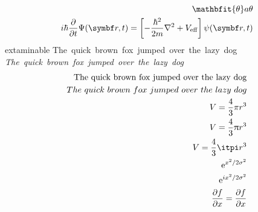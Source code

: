 \begin{align}
\ \mathbfit{\theta} a \theta \\
i\hbar\pdv t \Psi(\vec r, t) = \left[-\frac{\hbar^2}{2m}\nabla^2 + V_{\mathrm{eff}}\right]\psi(\vec r, t)
\end{align}
extaminable
The\ quick\ brown\ fox\ jumped\ over\ the\ lazy\ dog
\emph{The\ quick\ brown\ fox\ jumped\ over\ the\ lazy\ dog}
\begin{align}
\mathrm{The\ quick\ brown\ fox\ jumped\ over\ the\ lazy\ dog}\\
The\ quick\ brown\ fox\ jumped\ over\ the\ lazy\ dog\\
V = \frac43\pi r^3\\
V = \frac43\uppi r^3\\
V = \frac43\itpi r^3\\
\e^{x^2/{2\sigma^2}}\\
\e^{ i x^2/{2\sigma^2}}\\
\pdv{f}{x} = \frac{\partial f}{\partial x}
\end{align}


